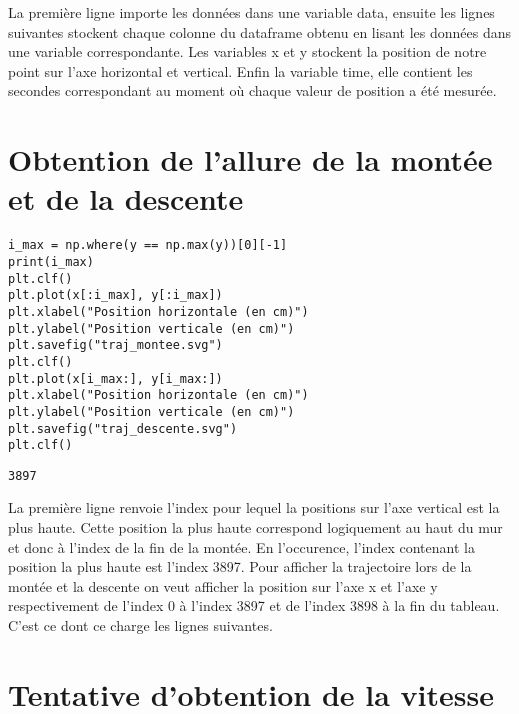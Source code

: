 \documentclass[11pt]{article}
\begin{document}
La première ligne importe les données dans une variable data, ensuite les lignes suivantes stockent chaque colonne du dataframe obtenu en lisant les
données dans une variable correspondante. Les variables x et y stockent la position de notre point sur l'axe horizontal et vertical. Enfin la variable
time, elle contient les secondes correspondant au moment où chaque valeur de position a été mesurée.
\section{Obtention de l'allure de la montée et de la descente}
\label{sec:orgfebe702}

\begin{verbatim}
i_max = np.where(y == np.max(y))[0][-1]
print(i_max)
plt.clf()
plt.plot(x[:i_max], y[:i_max])
plt.xlabel("Position horizontale (en cm)")
plt.ylabel("Position verticale (en cm)")
plt.savefig("traj_montee.svg")
plt.clf()
plt.plot(x[i_max:], y[i_max:])
plt.xlabel("Position horizontale (en cm)")
plt.ylabel("Position verticale (en cm)")
plt.savefig("traj_descente.svg")
plt.clf()
\end{verbatim}

\label{orga249ff6}
\begin{verbatim}
3897
\end{verbatim}


La première ligne renvoie l'index pour lequel la positions sur l'axe vertical est la plus haute. Cette position la plus haute correspond
logiquement au haut du mur et donc à l'index de la fin de la montée. En l'occurence, l'index contenant la position la plus haute est l'index 3897.
Pour afficher la trajectoire lors de la montée et la descente on veut afficher la position sur l'axe x et l'axe y respectivement de l'index 0 à
l'index 3897 et de l'index 3898 à la fin du tableau. C'est ce dont ce charge les lignes suivantes.

\begin{center}

\end{center}

\begin{center}

\end{center}
\section{Tentative d'obtention de la vitesse}
\label{sec:org1adc092}
\end{document}
